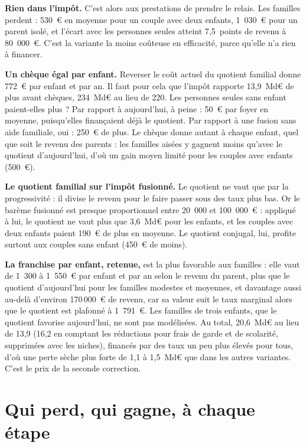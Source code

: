 \documentclass[11pt,a4paper]{article}
\begin{document}
\textbf{Rien dans l'impôt.} C'est alors aux prestations de prendre le relais. Les familles perdent : 530~€ en moyenne
pour un couple avec deux enfants, 1~030~€ pour un parent isolé, et l'écart avec les personnes seules
atteint 7,5~points de revenu à 80~000~€. C'est la variante la moins coûteuse en efficacité, parce qu'elle
n'a rien à financer.

\textbf{Un chèque égal par enfant.} Reverser le coût actuel du quotient familial donne 772~€ par enfant et
par an. Il faut pour cela que l'impôt rapporte 13,9~Md€ de plus avant chèques, 234~Md€ au lieu de 220. Les
personnes seules sans enfant paient-elles plus ? Par rapport à aujourd'hui, à peine : 50~€ par foyer en
moyenne, puisqu'elles finançaient déjà le quotient. Par rapport à une fusion sans aide familiale, oui :
250~€ de plus. Le chèque donne autant à chaque enfant, quel que soit le revenu des parents : les familles
aisées y gagnent moins qu'avec le quotient d'aujourd'hui, d'où un gain moyen limité pour les couples avec
enfants (500~€).

\textbf{Le quotient familial sur l'impôt fusionné.} Le quotient ne vaut que par la progressivité : il
divise le revenu pour le faire passer sous des taux plus bas. Or le barème fusionné est presque
proportionnel entre 20~000 et 100~000~€ : appliqué à lui, le quotient ne vaut plus que 3,6~Md€ pour les
enfants, et les couples avec deux enfants paient 190~€ de plus en moyenne. Le quotient conjugal, lui, profite
surtout aux couples sans enfant (450~€ de moins).

\textbf{La franchise par enfant, retenue,} est la plus favorable aux familles : elle vaut de 1~300 à
1~550~€ par enfant et par an selon le revenu du parent, plus que le quotient d'aujourd'hui pour les familles
modestes et moyennes, et davantage aussi au-delà d'environ 170\,000~€ de revenu, car sa valeur suit le taux
marginal alors que le quotient est plafonné à 1~791~€. Les familles de trois enfants, que le quotient
favorise aujourd'hui, ne sont pas modélisées. Au total, 20,6~Md€ au lieu de 13,9 (16,2 en comptant les
réductions pour frais de garde et de scolarité, supprimées avec les niches), financés par des taux un peu plus élevés pour tous, d'où une perte sèche
plus forte de 1,1 à 1,5~Md€ que dans les autres variantes. C'est le prix de la seconde correction.

\section{Qui perd, qui gagne, à chaque étape}
\end{document}
